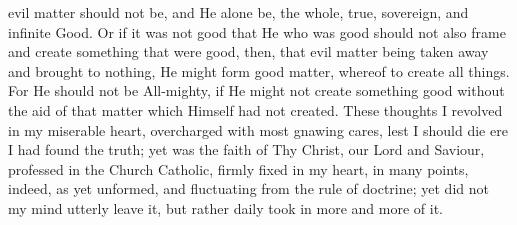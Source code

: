 \documentclass[b5paper,openright,12pt,twoside]{book}
\begin{document}
evil matter should not be, and He alone be, the whole, true, sovereign,
and infinite Good. Or if it was not good that He who was good should not
also frame and create something that were good, then, that evil matter
being taken away and brought to nothing, He might form good matter,
whereof to create all things. For He should not be All-mighty, if He
might not create something good without the aid of that matter which
Himself had not created. These thoughts I revolved in my miserable
heart, overcharged with most gnawing cares, lest I should die ere I had
found the truth; yet was the faith of Thy Christ, our Lord and Saviour,
professed in the Church Catholic, firmly fixed in my heart, in many
points, indeed, as yet unformed, and fluctuating from the rule of
doctrine; yet did not my mind utterly leave it, but rather daily took in
more and more of it.
\end{document}
